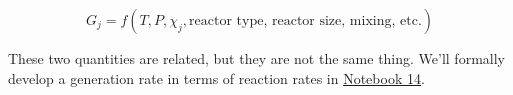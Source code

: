 \documentclass[11pt]{article}
\begin{document}
\[G_j = f(T, P, \chi_j, \text{reactor type, reactor size, mixing, etc.})\]

These two quantities are related, but they are not the same thing. We'll
formally develop a generation rate in terms of reaction rates in
\href{https://jqbond.github.io/CEN587/Notebooks/587-N14.html}{Notebook
14}.


    
    
    
\end{document}
